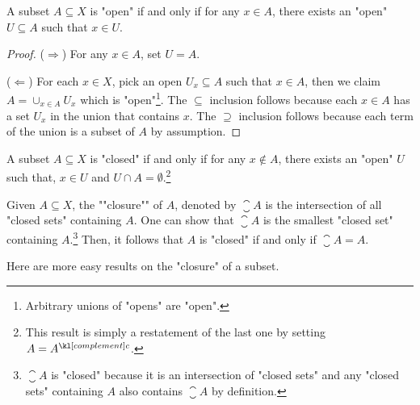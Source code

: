 \documentclass[main.tex]{subfiles}
\begin{document}
\begin{prop}\label{prop:openchar}
	A subset $A \subseteq X$ is "open" if and only if for any $x \in A$, there exists an "open" $U \subseteq A$ such that $x \in U$.
\end{prop}
\begin{proof}
	($\Rightarrow$) For any $x \in A$, set $U = A$.
	
	($\Leftarrow$) For each $x \in X$, pick an open $U_x \subseteq A$ such that $x \in A$, then we claim $A = \cup_{x \in A} U_x$ which is "open"\footnote{Arbitrary unions of "opens" are "open".}. The $\subseteq$ inclusion follows because each $x \in A$ has a set $U_x$ in the union that contains $x$. The $\supseteq$ inclusion follows because each term of the union is a subset of $A$ by assumption.
\end{proof}
\begin{prop}\label{prop:closedchar}
	A subset $A\subseteq X$ is "closed" if and only if for any $x \notin A$, there exists an "open" $U$ such that, $x \in U$ and $U\cap A = \emptyset$.\footnote{This result is simply a restatement of the last one by setting $A = A^\comple$.}
\end{prop}
\begin{defn}%
	\AP Given $A \subseteq X$, the ""closure"" of $A$, denoted by $\closure{A}$ is the intersection of all "closed sets" containing $A$. One can show that $\closure{A}$ is the smallest "closed set" containing $A$.\footnote{$\closure{A}$ is "closed" because it is an intersection of "closed sets" and any "closed sets" containing $A$ also contains $\closure{A}$ by definition.} Then, it follows that $A$ is "closed" if and only if $\closure{A} = A$.
\end{defn}
Here are more easy results on the "closure" of a subset.
\end{document}
